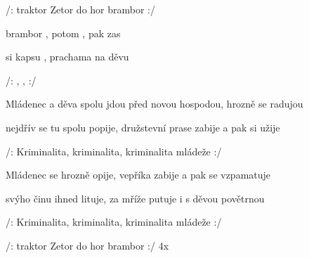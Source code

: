 

\zr
/:  traktor  Zetor  do hor  brambor :/
\kr

\zs
{} brambor , potom , pak zas 

 si kapsu , prachama  na děvu 

/: , ,   :/
\ks

\zs
Mládenec a děva  spolu jdou před novou hospodou, hrozně se  radujou

nejdřív se tu spolu  popije, družstevní prase zabije a pak si užije

/: Kriminalita, kriminalita, kriminalita mládeže :/
\ks

\zs
Mládenec se hrozně opije, vepříka  zabije a pak se vzpamatuje

svýho činu ihned lituje, za mříže  putuje i s děvou povětrnou

/: Kriminalita, kriminalita, kriminalita mládeže :/
\ks

\zr
/:  traktor  Zetor  do hor  brambor :/ 4x
\kr

\kp





